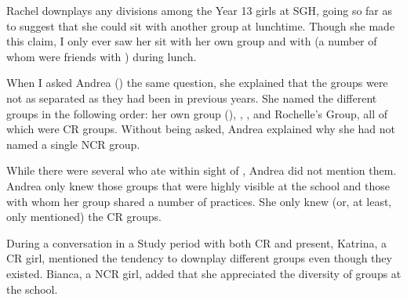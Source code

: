 \noindent Rachel downplays any divisions among the Year 13 girls at SGH, going so far as to suggest that she could sit with another group at lunchtime. Though she made this claim, I only ever saw her sit with her own group and with  (a number of whom were friends with ) during lunch. 


When I asked Andrea () the same question, she explained that the groups were not as separated as they had been in previous years. She named the different groups in the following order: her own group (), , , and Rochelle's Group, all of which were CR groups. Without being asked, Andrea explained why she had not named a single NCR group.

\label{ex:thispartoflawn}

\vspace{5 mm}

\noindent While there were several  who ate within sight of , Andrea did not mention them. Andrea only knew those groups that were highly visible at the school and those with whom her group shared a number of practices. She only knew (or, at least, only mentioned) the CR groups.

During a conversation in a Study period with both CR and  present, Katrina, a CR girl, mentioned the tendency to downplay different groups even though they existed. Bianca, a NCR girl, added that she appreciated the diversity of groups at the school.

